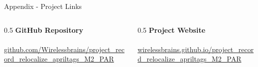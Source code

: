 \begin{frame}[label=appendix-project-links]{Appendix - Project Links}
\transfade[duration=0.25]
\vspace{-0.05cm}
\begin{outlinecard}
  \small
  \begin{columns}[T,onlytextwidth]
    \begin{column}{0.5\textwidth}
      \centering
      {\bfseries GitHub Repository}\\[1mm]
      \\[1mm]
      \tiny\url{github.com/Wirelessbrains/project_record_relocalize_apriltags_M2_PAR}
    \end{column}
    \begin{column}{0.5\textwidth}
      \centering
      {\bfseries Project Website}\\[1mm]
      \\[1mm]
      \tiny\url{wirelessbrains.github.io/project_record_relocalize_apriltags_M2_PAR}
    \end{column}
  \end{columns}
\end{outlinecard}
\end{frame}

